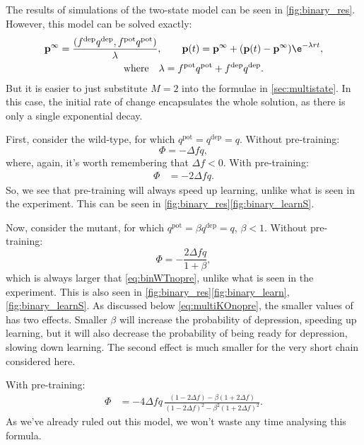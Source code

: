 \documentclass[12pt]{article}
\newcommand{\pr}{\mathbf{p}}
\newcommand{\eq}{\pr^\infty}
\newcommand{\pot}{^{\text{pot}}}
\newcommand{\dep}{^{\text{dep}}}
\begin{document}
The results of simulations of the two-state model can be seen in \autoref{fig:binary_res}.
However, this model can be solved exactly:
%
\begin{multline}\label{eq:binarysol}
  \eq = \frac{(f\dep q\dep, f\pot q\pot)}{\lambda},
  \qquad
  \pr(t) = \eq + (\pr(t)-\eq)\e^{-\lambda rt},\\
  \qquad \text{where} \quad
  \lambda = f\pot q\pot + f\dep q\dep.
\end{multline}
%
But it is easier to just substitute $M=2$ into the formulae in \autoref{sec:multistate}.
In this case, the initial rate of change encapsulates the whole solution, as there is only a single exponential decay.

First, consider the wild-type, for which $q\pot=q\dep=q$.
Without pre-training:
%
\begin{equation}\label{eq:binWTnopre}
  \Phi = -\Delta f q,
\end{equation}
%
where, again, it's worth remembering that $\Delta f<0$.
With pre-training:
%
\begin{equation}\label{eq:binWTpre}
\begin{aligned}
  \Phi &= -2\Delta f q.
\end{aligned}
\end{equation}
%
So, we see that pre-training will always speed up learning, unlike what is seen in the experiment.
This can be seen in \autoref{fig:binary_res}\ref{fig:binary_learnS}.

Now, consider the mutant, for which $q\pot=\beta q\dep=q$, $\beta<1$.
Without pre-training:
%
\begin{equation}\label{eq:binKOnopre}
  \Phi = -\frac{2\Delta f q}{1+\beta},
\end{equation}
%
which is always larger that \eqref{eq:binWTnopre}, unlike what is seen in the experiment.
This is also seen in \autoref{fig:binary_res}\ref{fig:binary_learn},\ref{fig:binary_learnS}.
As discussed below \eqref{eq:multiKOnopre}, the smaller values of has two effects.
Smaller $\beta$ will increase the probability of depression, speeding up learning, but it will also decrease the probability of being ready for depression, slowing down learning.
The second effect is much smaller for the very short chain considered here.

With pre-training:
%
\begin{equation}\label{eq:binKOpre}
\begin{aligned}
  \Phi &= -4\Delta f q \, \frac{(1-2\Delta f) - \beta(1+2\Delta f)}
          {(1-2\Delta f)^2 - \beta^2(1+2\Delta f)^2}.
\end{aligned}
\end{equation}
%
As we've already ruled out this model, we won't waste any time analysing this formula.
\end{document}
